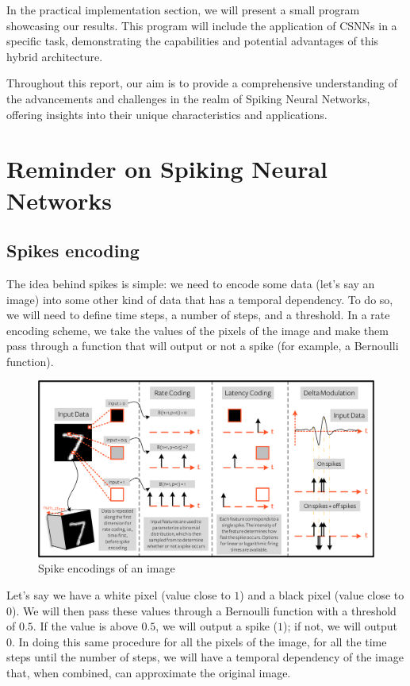 \documentclass[11pt]{article}
\begin{document}
In the practical implementation section, we will present a small program showcasing our results. This program will include the application of CSNNs in a specific task, demonstrating the capabilities and potential advantages of this hybrid architecture.

Throughout this report, our aim is to provide a comprehensive understanding of the advancements and challenges in the realm of Spiking Neural Networks, offering insights into their unique characteristics and applications.

\pagebreak 

\section{Reminder on Spiking Neural Networks}

\subsection{Spikes encoding}

The idea behind spikes is simple: we need to encode some data (let's say an image) into some other kind of data that has a temporal dependency. To do so, we will need to define time steps, a number of steps, and a threshold. 
In a rate encoding scheme, we take the values of the pixels of the image and make them pass through a function that will output or not a spike (for example, a Bernoulli function).

\begin{figure}[ht]
  \centering
  \includegraphics[width=\textwidth]{./image/spikeconv.png}
  \caption{Spike encodings of an image}
\end{figure}

Let's say we have a white pixel (value close to $1$) and a black pixel (value close to $0$). We will then pass these values through a Bernoulli function with a threshold of $0.5$. If the value is above $0.5$, we will output a spike ($1$); if not, we will output $0$.
In doing this same procedure for all the pixels of the image, for all the time steps until the number of steps, we will have a temporal dependency of the image that, when combined, can approximate the original image.
\end{document}

